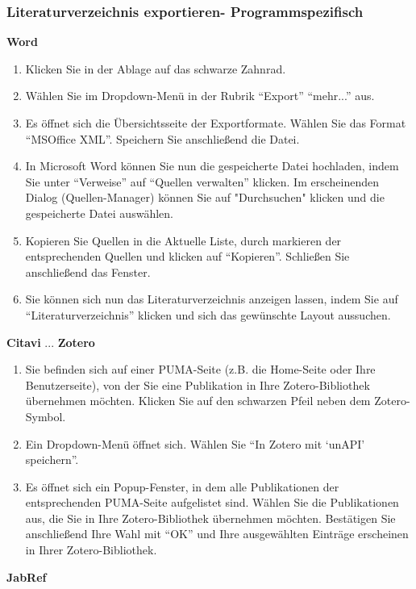 \documentclass[a4paper,11pt,twoside]{scrbook}
\begin{document}
\subsubsection{Literaturverzeichnis exportieren- Programmspezifisch}
\textbf{Word} 
\begin{enumerate}
    \item Klicken Sie in der Ablage auf das schwarze Zahnrad.
    \item Wählen Sie im Dropdown-Menü in der Rubrik \enquote{Export} \enquote{mehr...} aus.
    \item Es öffnet sich die Übersichtsseite der Exportformate. Wählen Sie das Format \enquote{MSOffice XML}. Speichern Sie anschließend die Datei.
    \item In Microsoft Word können Sie nun die gespeicherte Datei hochladen, indem Sie unter \enquote{Verweise} auf \enquote{Quellen verwalten} klicken. Im erscheinenden Dialog (Quellen-Manager) können Sie auf "Durchsuchen" klicken und die gespeicherte Datei auswählen. 
    \item Kopieren Sie Quellen in die Aktuelle Liste, durch markieren der entsprechenden Quellen und klicken auf \enquote{Kopieren}. Schließen Sie anschließend das Fenster.
    \item Sie können sich nun das Literaturverzeichnis anzeigen lassen, indem Sie auf \enquote{Literaturverzeichnis} klicken und sich das gewünschte Layout aussuchen.
\end{enumerate}
\textbf{Citavi}\newline
...\newline
\textbf{Zotero}
\begin{enumerate}
    \item Sie befinden sich auf einer PUMA-Seite (z.B. die Home-Seite oder Ihre Benutzerseite), von der Sie eine Publikation in Ihre Zotero-Bibliothek übernehmen möchten. Klicken Sie auf den schwarzen Pfeil neben dem Zotero-Symbol.
    \item Ein Dropdown-Menü öffnet sich. Wählen Sie \enquote{In Zotero mit \enquote{unAPI} speichern}.
    \item Es öffnet sich ein Popup-Fenster, in dem alle Publikationen der entsprechenden PUMA-Seite aufgelistet sind. Wählen Sie die Publikationen aus, die Sie in Ihre Zotero-Bibliothek übernehmen möchten. Bestätigen Sie anschließend Ihre Wahl mit \enquote{OK} und Ihre ausgewählten Einträge erscheinen in Ihrer Zotero-Bibliothek.
\end{enumerate} 
\textbf{JabRef}
\end{document}

